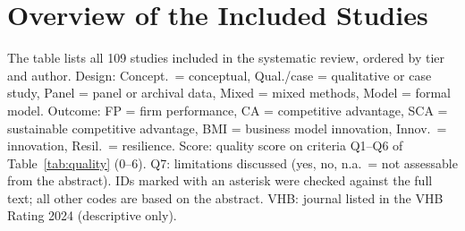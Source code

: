 \chapter{Overview of the Included Studies}
\label{AppendixB}

The table lists all 109 studies included in the systematic review, ordered by tier and author. Design: Concept.\ = conceptual, Qual./case = qualitative or case study, Panel = panel or archival data, Mixed = mixed methods, Model = formal model. Outcome: FP = firm performance, CA = competitive advantage, SCA = sustainable competitive advantage, BMI = business model innovation, Innov.\ = innovation, Resil.\ = resilience. Score: quality score on criteria Q1--Q6 of Table~\ref{tab:quality} (0--6). Q7: limitations discussed (yes, no, n.a.\ = not assessable from the abstract). IDs marked with an asterisk were checked against the full text; all other codes are based on the abstract. VHB: journal listed in the VHB Rating 2024 (descriptive only).


